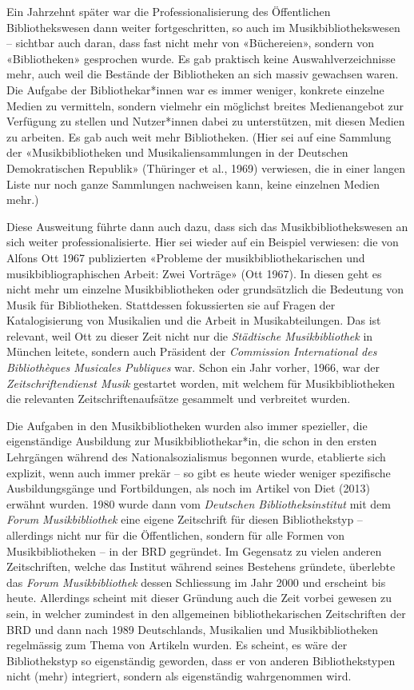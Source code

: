 \documentclass[a4paper,
fontsize=11pt,
oneside,
numbers=noperiodatend,
parskip=half-,
bibliography=totoc,
final
]{scrartcl}
\begin{document}
Ein Jahrzehnt später war die Professionalisierung des Öffentlichen
Bibliothekswesen dann weiter fortgeschritten, so auch im
Musikbibliothekswesen -- sichtbar auch daran, dass fast nicht mehr von
«Büchereien», sondern von «Bibliotheken» gesprochen wurde. Es gab
praktisch keine Auswahlverzeichnisse mehr, auch weil die Bestände der
Bibliotheken an sich massiv gewachsen waren. Die Aufgabe der
Bibliothekar*innen war es immer weniger, konkrete einzelne Medien zu
vermitteln, sondern vielmehr ein möglichst breites Medienangebot zur
Verfügung zu stellen und Nutzer*innen dabei zu unterstützen, mit diesen
Medien zu arbeiten. Es gab auch weit mehr Bibliotheken. (Hier sei auf
eine Sammlung der «Musikbibliotheken und Musikaliensammlungen in der
Deutschen Demokratischen Republik» (Thüringer et al., 1969) verwiesen,
die in einer langen Liste nur noch ganze Sammlungen nachweisen kann,
keine einzelnen Medien mehr.)

Diese Ausweitung führte dann auch dazu, dass sich das
Musikbibliothekswesen an sich weiter professionalisierte. Hier sei
wieder auf ein Beispiel verwiesen: die von Alfons Ott 1967 publizierten
«Probleme der musikbibliothekarischen und musikbibliographischen Arbeit:
Zwei Vorträge» (Ott 1967). In diesen geht es nicht mehr um einzelne
Musikbibliotheken oder grundsätzlich die Bedeutung von Musik für
Bibliotheken. Stattdessen fokussierten sie auf Fragen der
Katalogisierung von Musikalien und die Arbeit in Musikabteilungen. Das
ist relevant, weil Ott zu dieser Zeit nicht nur die \emph{Städtische
Musikbibliothek} in München leitete, sondern auch Präsident der
\emph{Commission International des Bibliothèques Musicales Publiques}
war. Schon ein Jahr vorher, 1966, war der \emph{Zeitschriftendienst
Musik} gestartet worden, mit welchem für Musikbibliotheken die
relevanten Zeitschriftenaufsätze gesammelt und verbreitet wurden.

Die Aufgaben in den Musikbibliotheken wurden also immer spezieller, die
eigenständige Ausbildung zur Musikbibliothekar*in, die schon in den
ersten Lehrgängen während des Nationalsozialismus begonnen wurde,
etablierte sich explizit, wenn auch immer prekär -- so gibt es heute
wieder weniger spezifische Ausbildungsgänge und Fortbildungen, als noch
im Artikel von Diet (2013) erwähnt wurden. 1980 wurde dann vom
\emph{Deutschen Bibliotheksinstitut} mit dem \emph{Forum
Musikbibliothek} eine eigene Zeitschrift für diesen Bibliothekstyp --
allerdings nicht nur für die Öffentlichen, sondern für alle Formen von
Musikbibliotheken -- in der BRD gegründet. Im Gegensatz zu vielen
anderen Zeitschriften, welche das Institut während seines Bestehens
gründete, überlebte das \emph{Forum Musikbibliothek} dessen Schliessung
im Jahr 2000 und erscheint bis heute. Allerdings scheint mit dieser
Gründung auch die Zeit vorbei gewesen zu sein, in welcher zumindest in
den allgemeinen bibliothekarischen Zeitschriften der BRD und dann nach
1989 Deutschlands, Musikalien und Musikbibliotheken regelmässig zum
Thema von Artikeln wurden. Es scheint, es wäre der Bibliothekstyp so
eigenständig geworden, dass er von anderen Bibliothekstypen nicht (mehr)
integriert, sondern als eigenständig wahrgenommen wird.
\end{document}
